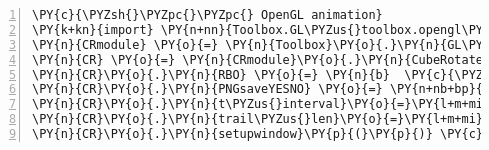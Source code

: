 \begin{Verbatim}[commandchars=\\\{\},fontsize=\small, numbers = left, frame=bottomline]
\PY{c}{\PYZsh{}\PYZpc{}\PYZpc{} OpenGL animation}
\PY{k+kn}{import} \PY{n+nn}{Toolbox.GL\PYZus{}toolbox.opengl\PYZus{}window\PYZus{}and\PYZus{}animation\PYZus{}creation\PYZus{}module}
\PY{n}{CRmodule} \PY{o}{=} \PY{n}{Toolbox}\PY{o}{.}\PY{n}{GL\PYZus{}toolbox}\PY{o}{.}\PY{n}{opengl\PYZus{}window\PYZus{}and\PYZus{}animation\PYZus{}creation\PYZus{}module}
\PY{n}{CR} \PY{o}{=} \PY{n}{CRmodule}\PY{o}{.}\PY{n}{CubeRotate}\PY{p}{(}\PY{p}{)}  \PY{c}{\PYZsh{}opengl context setup    }
\PY{n}{CR}\PY{o}{.}\PY{n}{RBO} \PY{o}{=} \PY{n}{b}  \PY{c}{\PYZsh{}passing in the solved results}
\PY{n}{CR}\PY{o}{.}\PY{n}{PNGsaveYESNO} \PY{o}{=} \PY{n+nb+bp}{False} 
\PY{n}{CR}\PY{o}{.}\PY{n}{t\PYZus{}interval}\PY{o}{=}\PY{l+m+mi}{20}
\PY{n}{CR}\PY{o}{.}\PY{n}{trail\PYZus{}len}\PY{o}{=}\PY{l+m+mi}{150}
\PY{n}{CR}\PY{o}{.}\PY{n}{setupwindow}\PY{p}{(}\PY{p}{)} \PY{c}{\PYZsh{}animate}
\end{Verbatim}

